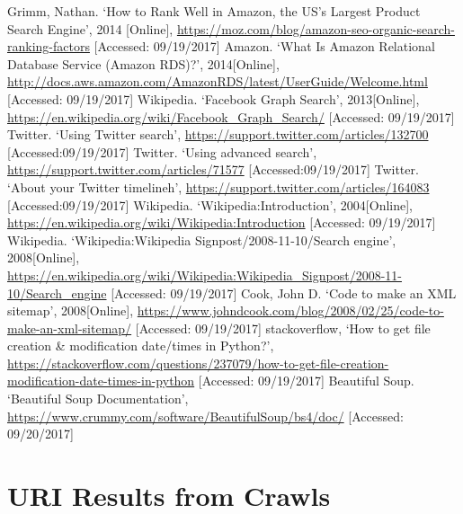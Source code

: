 \documentclass[12pt]{report}
\begin{document}
\begin{thebibliography}{9}
 Grimm, Nathan. `How to Rank Well in Amazon, the US's Largest Product Search Engine', 2014 [Online], \url{ https://moz.com/blog/amazon-seo-organic-search-ranking-factors} [Accessed: 09/19/2017] 
Amazon. `What Is Amazon Relational Database Service (Amazon RDS)?', 2014[Online],\url{ http://docs.aws.amazon.com/AmazonRDS/latest/UserGuide/Welcome.html} [Accessed: 09/19/2017]
Wikipedia. `Facebook Graph Search', 2013[Online], \url{https://en.wikipedia.org/wiki/Facebook_Graph_Search/} [Accessed: 09/19/2017]
Twitter. `Using Twitter search', \url{https://support.twitter.com/articles/132700} [Accessed:09/19/2017] 
Twitter. `Using advanced search', \url{https://support.twitter.com/articles/71577} [Accessed:09/19/2017] 
Twitter. `About your Twitter timelineh', \url{https://support.twitter.com/articles/164083} [Accessed:09/19/2017] 
Wikipedia. `Wikipedia:Introduction', 2004[Online], \url{https://en.wikipedia.org/wiki/Wikipedia:Introduction} [Accessed: 09/19/2017]
Wikipedia. `Wikipedia:Wikipedia Signpost/2008-11-10/Search engine', 2008[Online], \url{https://en.wikipedia.org/wiki/Wikipedia:Wikipedia_Signpost/2008-11-10/Search_engine} [Accessed: 09/19/2017]
Cook, John D.  `Code to make an XML sitemap', 2008[Online], \url{https://www.johndcook.com/blog/2008/02/25/code-to-make-an-xml-sitemap/} [Accessed: 09/19/2017]
stackoverflow, `How to get file creation \& modification date/times in Python?', \url{https://stackoverflow.com/questions/237079/how-to-get-file-creation-modification-date-times-in-python} [Accessed: 09/19/2017]
Beautiful Soup. `Beautiful Soup Documentation', \url{ https://www.crummy.com/software/BeautifulSoup/bs4/doc/} [Accessed: 09/20/2017]
\end{thebibliography}

\chapter{URI Results from Crawls}
 
\end{document}
